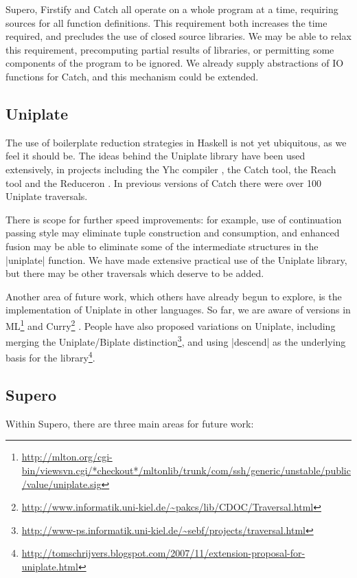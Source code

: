Supero, Firstify and Catch all operate on a whole program at a time, requiring sources for all function definitions. This requirement both increases the time required, and precludes the use of closed source libraries. We may be able to relax this requirement, precomputing partial results of libraries, or permitting some components of the program to be ignored. We already supply abstractions of IO functions for Catch, and this mechanism could be extended.

\subsection{Uniplate}

The use of boilerplate reduction strategies in Haskell is not yet ubiquitous, as we feel it should be. The ideas behind the Uniplate library have been used extensively, in projects including the Yhc compiler \citep{me:yhc_core}, the Catch tool, the Reach tool \cite{naylor:reach} and the Reduceron \cite{naylor:reduceron}. In previous versions of Catch there were over 100 Uniplate traversals.

There is scope for further speed improvements: for example, use of continuation passing style may eliminate tuple construction and consumption, and enhanced fusion may be able to eliminate some of the intermediate structures in the |uniplate| function. We have made extensive practical use of the Uniplate library, but there may be other traversals which deserve to be added.

Another area of future work, which others have already begun to explore, is the implementation of Uniplate in other languages. So far, we are aware of versions in ML\footnote{\url{http://mlton.org/cgi-bin/viewsvn.cgi/*checkout*/mltonlib/trunk/com/ssh/generic/unstable/public/value/uniplate.sig}} \cite{ml} and Curry\footnote{\url{http://www.informatik.uni-kiel.de/~pakcs/lib/CDOC/Traversal.html}} \cite{curry}. People have also proposed variations on Uniplate, including merging the Uniplate/Biplate distinction\footnote{\url{http://www-ps.informatik.uni-kiel.de/~sebf/projects/traversal.html}}, and using |descend| as the underlying basis for the library\footnote{\url{http://tomschrijvers.blogspot.com/2007/11/extension-proposal-for-uniplate.html}}.

\subsection{Supero}

Within Supero, there are three main areas for future work:


